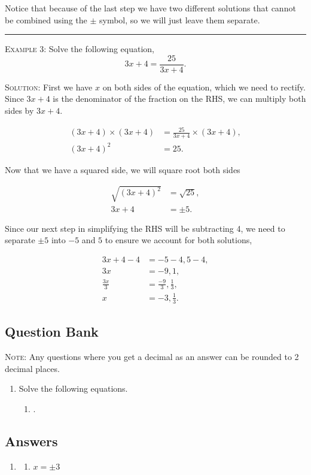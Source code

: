\documentclass[a4paper,12pt]{article}
\begin{document}
Notice that because of the last step we have two different
solutions that cannot be combined using the $\pm$ symbol, so
we will just leave them separate.

\vspace{3mm}
\hrule
\vspace{3mm}

\textsc{Example 3}: Solve the following equation,
$$3x + 4 = \frac{25}{3x + 4}.$$

\textsc{Solution}: First we have $x$ on both sides of the 
equation, which we need to rectify. Since $3x+4$ is the 
denominator of the fraction on the RHS, we can multiply both
sides by $3x+4$.

\begin{align*}
(3x + 4) \times (3x + 4) &= \frac{25}{3x + 4} \times (3x + 4), \\
(3x + 4)^2 &= 25.
\end{align*}

Now that we have a squared side, we will square root both
sides

\begin{align*}
\sqrt{(3x + 4)^2} &= \sqrt{25}, \\
3x + 4 &= \pm 5.
\end{align*}

Since our next step in simplifying the RHS will be subtracting 
4, we need to separate $\pm 5$ into $-5$ and $5$ to ensure 
we account for both solutions,

\begin{align*}
3x + 4 - 4 &= -5 - 4, 5 - 4, \\
3x &= -9, 1, \\
\frac{3x}{3} &= \frac{-9}{3}, \frac{1}{3}, \\
x &= -3, \frac{1}{3}.
\end{align*}

\newpage
\subsection*{Question Bank}

\textsc{Note}: Any questions where you get a decimal as an answer
can be rounded to 2 decimal places.

\begin{enumerate}
\item Solve the following equations.
    \begin{multicols}{2}
    \begin{enumerate}
    \item .
    \end{enumerate}
    \end{multicols}


\end{enumerate}

\newpage
\subsection*{Answers}

\begin{enumerate}
\item 
    \begin{multicols}{2}
    \begin{enumerate}
    \item $x = \pm 3$
    \end{enumerate}
    \end{multicols}

\end{enumerate}
\end{document}
